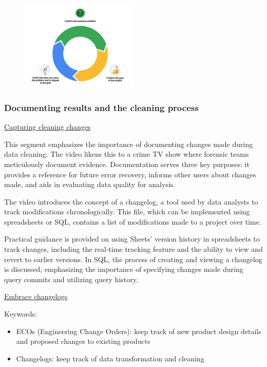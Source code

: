 \documentclass[]{article}
\begin{document}
\begin{figure}[!ht]
  \centering
  \includegraphics[width=0.5\textwidth]{image/check_list.png}
\end{figure}

\subsubsection{Documenting results and the cleaning process}

\uline{Capturing cleaning changes}

This segment emphasizes the importance of documenting changes made during data cleaning. The video likens this to a crime TV show where forensic teams meticulously document evidence. Documentation serves three key purposes: it provides a reference for future error recovery, informs other users about changes made, and aids in evaluating data quality for analysis.

The video introduces the concept of a changelog, a tool used by data analysts to track modifications chronologically. This file, which can be implemented using spreadsheets or SQL, contains a list of modifications made to a project over time.

Practical guidance is provided on using Sheets' version history in spreadsheets to track changes, including the real-time tracking feature and the ability to view and revert to earlier versions. In SQL, the process of creating and viewing a changelog is discussed, emphasizing the importance of specifying changes made during query commits and utilizing query history.

\uline{Embrace changelogs}

Keywords:
\begin{itemize}
  \item ECOs (Engineering Change Orders): keep track of new product design details and proposed changes to existing products
  \item Changelogs: keep track of data transformation and cleaning
\end{itemize}
\end{document}
